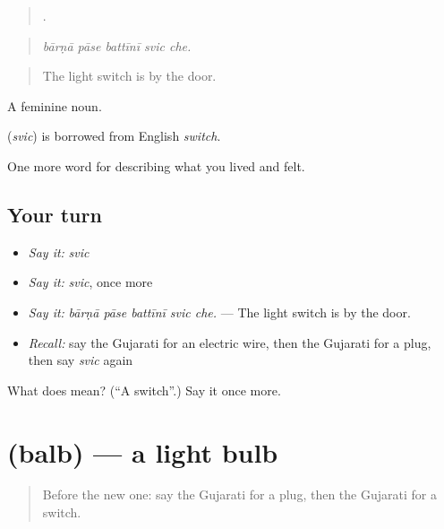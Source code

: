 \begin{quote}
    .
\end{quote}

\begin{quote}
\emph{bārṇā pāse battīnī svic che.}
\end{quote}

\begin{quote}
The light switch is by the door.
\end{quote}

A feminine noun.

\begin{cousinweb}
\textbf{} (\emph{svic}) is borrowed from English \emph{switch}.
\end{cousinweb}

\begin{grammarlens}[title={What you've built}]
One more word for describing what you lived and felt.
\end{grammarlens}

\subsection*{Your turn}
\begin{itemize}
\raggedright
  \item \emph{Say it:} \emph{svic}
  \item \emph{Say it:} \emph{svic}, once more
  \item \emph{Say it:} \emph{bārṇā pāse battīnī svic che.} — The light switch is by the door.
  \item \emph{Recall:} say the Gujarati for an electric wire, then the Gujarati for a plug, then say \emph{svic} again
\end{itemize}

\begin{tcolorbox}[breakable,colback=teal!4,colframe=teal!35!black,title={Before you move on}]
What does  mean? (\textquotedblleft{}A switch\textquotedblright{}.) Say it once more.
\end{tcolorbox}
\section[\texorpdfstring{\gu{બલ્બ} (balb)}{બલ્બ (balb)}]{ (balb) — a light bulb}

\label{lesson:GU-C517-balb}



\begin{quote}
Before the new one: say the Gujarati for a plug, then the Gujarati for a switch.
\end{quote}

